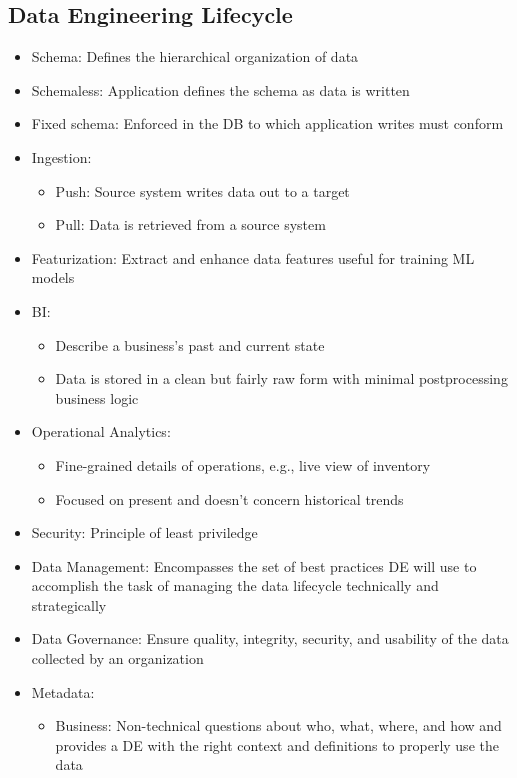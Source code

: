 \documentclass[11pt]{scrartcl}
\begin{document}
\subsection*{Data Engineering Lifecycle}
\begin{itemize}
	\item Schema: Defines the hierarchical organization of data
	\item Schemaless: Application defines the schema as data is written
	\item Fixed schema: Enforced in the DB to which application writes must conform
	\item Ingestion:
	\begin{itemize}
		\item Push: Source system writes data out to a target
		\item Pull: Data is retrieved from a source system
	\end{itemize}
	\item Featurization: Extract and enhance data features useful for training ML models
	\item BI: 
	\begin{itemize}
		\item Describe a business's past and current state
		\item Data is stored in a clean but fairly raw form with minimal postprocessing business logic
	\end{itemize}
	\item Operational Analytics: 
	\begin{itemize}
		\item Fine-grained details of operations, e.g., live view of inventory
		\item Focused on present and doesn't concern historical trends
	\end{itemize}
	\item Security: Principle of least priviledge
	\item Data Management: Encompasses the set of best practices DE will use to accomplish the task of managing the data lifecycle technically and strategically 
	\item Data Governance: Ensure quality, integrity, security, and usability of the data collected by an organization
	\item Metadata:
	\begin{itemize}
		\item Business: Non-technical questions about who, what, where, and how and provides a DE with the right context and definitions to properly use the data

\end{itemize}
\end{itemize}
\end{document}

